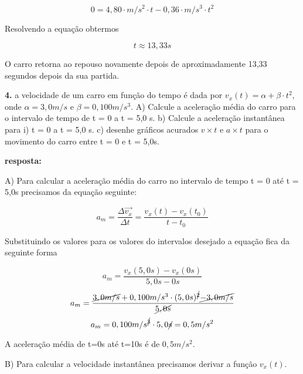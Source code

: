 \documentclass[a4paper, 12pt]{article}
\begin{document}
\begin{flushleft}
		\begin{equation*}
			0 = 4,80 \cdot m/s^2 \cdot t - 0,36 \cdot m/s^3 \cdot t^2
		\end{equation*}
		
		Resolvendo a equação obtermos
		
		\begin{equation*}
			t \approx 13,33s 
		\end{equation*}
		
		O carro retorna ao repouso novamente depois de aproximadamente 13,33 segundos depois da sua partida.
		
		\vspace{2em}
		
		\textbf{4.} a velocidade de um carro em função do tempo é dada por $v_x(t) = \alpha + \beta \cdot t^2$, onde $\alpha = 3,0m/s$ e $\beta = 0,100 m/s^3$. A) Calcule a aceleração média do carro para o intervalo de tempo de t = 0 a t = 5,0 s. b) Calcule a aceleração instantânea para i) t = 0 a t = 5,0 s. c) desenhe gráficos acurados $v \times t$ e $a \times t$ para o movimento do carro entre t = 0 e t = 5,0s.
		
		\textbf{resposta:}
		
		A) Para calcular a aceleração média do carro no intervalo de tempo t = 0 até t = 5,0s precisamos da equação seguinte:
		
		\begin{equation*}
			a_m = \frac{\Delta{\vec{v_x}}}{\Delta{t}} = \frac{v_x(t) - v_x(t_0)}{t - t_0}
		\end{equation*}
		
		Substituindo os valores para os valores do intervalos desejado a equação fica da seguinte forma
		
		\begin{equation*}
			a_m = \frac{v_x(5,0s) - v_x(0s)}{5,0s - 0s}   
		\end{equation*}
		\begin{equation*}
			a_m = \frac{\cancel{3,0m/s} + 0,100m/s^3 \cdot (5,0s)^{\cancel{2}} \cancel{- 3,0m/s}}{ \cancel{5,0s} }   
		\end{equation*}
		\begin{equation*}
			a_m = 0,100m/s^{\cancel{3}} \cdot 5,0 \cancel{s} = 0,5 m/s^2  
		\end{equation*}
		
		A aceleração média de t=0s até t=10s é de $0,5m/s^2$.
		
		B) Para calcular a velocidade instantânea precisamos derivar a função $v_x(t)$.
		

\end{flushleft}
\end{document}
